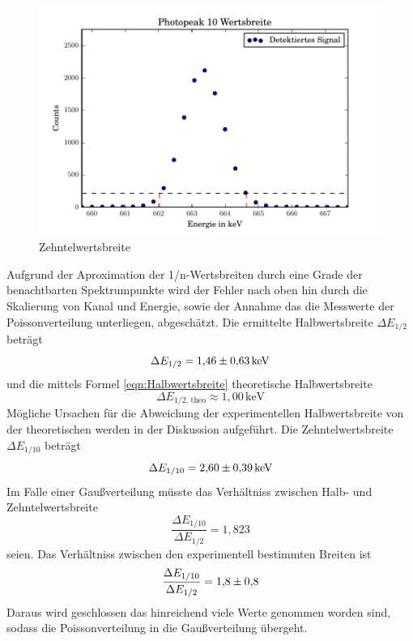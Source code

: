 \begin{figure}[h]
  \centering
  \includegraphics[width=\textwidth]{./build/10Wertsbreite.pdf}
  \caption{Zehntelwertsbreite}
  \label{fig:Zehntel}
\end{figure}
Aufgrund der Aproximation der 1/n-Wertsbreiten durch eine Grade der benachtbarten Spektrumpunkte wird der Fehler nach oben hin durch die Skalierung von Kanal und Energie, sowie der Annahme das die Messwerte der Poissonverteilung unterliegen, abgeschätzt. Die ermittelte Halbwertsbreite $\Delta E_{1/2}$ beträgt
\begin{equation}
  \Delta E_{1/2} = \num{1,46 +- 0,63} \, \text{keV}
\end{equation}
und die mittels Formel \ref{eqn:Halbwertsbreite} theoretische Halbwertsbreite
\begin{equation}
  \Delta E_{1/2 \text{, theo}} \approx 1,00 \, \text{keV}
  \label{eqn:HalbTheo}
\end{equation}
Mögliche Ursachen für die Abweichung der experimentellen Halbwertsbreite von der theoretischen werden in der Diskussion aufgeführt. Die Zehntelwertsbreite $\Delta E_{1/10}$ beträgt
\begin{equation}
  \Delta E_{1/10} = \num{2,60 +- 0,39} \, \text{keV}
\end{equation}
Im Falle einer Gaußverteilung müsste das Verhältniss zwischen Halb- und Zehntelwertsbreite
\begin{equation}
  \frac{\Delta E_{1/10}}{\Delta E_{1/2}} = 1,823
\end{equation}
seien. Das Verhältniss zwischen den experimentell bestimmten Breiten ist
\begin{equation}
  \frac{\Delta E_{1/10}}{\Delta E_{1/2}} = \num{1,8 +- 0,8}
  \label{eqn:Ver}
\end{equation}
Daraus wird geschlossen das hinreichend viele Werte genommen worden sind, sodass die Poissonverteilung in die Gaußverteilung übergeht.

